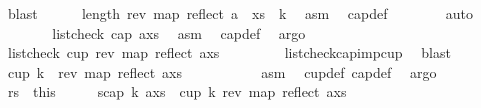 \begin{isabellebody}
\ blast\isanewline
\ \ \ \ \isamarkupfalse%
\ {}{\isacharcolon}{\kern0pt}{\isachardoublequoteopen}length\ {\isacharparenleft}{\kern0pt}rev\ {\isacharparenleft}{\kern0pt}map\ reflect\ {\isacharparenleft}{\kern0pt}a\ {\isacharhash}{\kern0pt}\ xs{\isacharparenright}{\kern0pt}{\isacharparenright}{\kern0pt}{\isacharparenright}{\kern0pt}\ {\isacharequal}{\kern0pt}\ k{\isachardoublequoteclose}\ \isamarkupfalse%
\ asm\ \isamarkupfalse%
\ cap{\isacharunderscore}{\kern0pt}def\isanewline
\ \ \ \ \ \ \isamarkupfalse%
\ auto\isanewline
\ \ \ \ \isamarkupfalse%
\ \isamarkupfalse%
\ {\isachardoublequoteopen}list{\isacharunderscore}{\kern0pt}check\ cap{}\ {\isacharparenleft}{\kern0pt}a{\isacharhash}{\kern0pt}xs{\isacharparenright}{\kern0pt}{\isachardoublequoteclose}\ \isamarkupfalse%
\ asm\ \isamarkupfalse%
\ cap{\isacharunderscore}{\kern0pt}def\ \isamarkupfalse%
\ argo\isanewline
\ \ \ \ \isamarkupfalse%
\ {\isachardoublequoteopen}list{\isacharunderscore}{\kern0pt}check\ cup{}\ {\isacharparenleft}{\kern0pt}rev\ {\isacharparenleft}{\kern0pt}map\ reflect\ {\isacharparenleft}{\kern0pt}a{\isacharhash}{\kern0pt}xs{\isacharparenright}{\kern0pt}{\isacharparenright}{\kern0pt}{\isacharparenright}{\kern0pt}{\isachardoublequoteclose}\ \isanewline
\ \ \ \ \ \ \isamarkupfalse%
\ list{\isacharunderscore}{\kern0pt}check{\isacharunderscore}{\kern0pt}cap{}{\isacharunderscore}{\kern0pt}imp{\isacharunderscore}{\kern0pt}cup{}\ \isamarkupfalse%
\ blast\isanewline
\ \ \ \ \isamarkupfalse%
\ {\isachardoublequoteopen}cup\ k\ \ {\isacharparenleft}{\kern0pt}rev\ {\isacharparenleft}{\kern0pt}map\ reflect\ {\isacharparenleft}{\kern0pt}a{\isacharhash}{\kern0pt}xs{\isacharparenright}{\kern0pt}{\isacharparenright}{\kern0pt}{\isacharparenright}{\kern0pt}{\isachardoublequoteclose}\ \isanewline
\ \ \ \ \ \ \isamarkupfalse%
\ {}\ {}\ asm\ \isamarkupfalse%
\ cup{\isacharunderscore}{\kern0pt}def\ cap{\isacharunderscore}{\kern0pt}def\ \isamarkupfalse%
\ argo\isakeywordONE{{\isacharbraceright}{\kern0pt}}\isamarkupfalse%
\ \isamarkupfalse%
\ rs\ {\isacharequal}{\kern0pt}\ this\isanewline
\ \ \isamarkupfalse%
\ \isamarkupfalse%
\ s{}{\isacharcolon}{\kern0pt}{\isachardoublequoteopen}cap\ k\ {\isacharparenleft}{\kern0pt}a{\isacharhash}{\kern0pt}xs{\isacharparenright}{\kern0pt}\ {\isasymlongrightarrow}\ cup\ k\ {\isacharparenleft}{\kern0pt}rev\ {\isacharparenleft}{\kern0pt}map\ reflect\ {\isacharparenleft}{\kern0pt}a{\isacharhash}{\kern0pt}xs{\isacharparenright}{\kern0pt}{\isacharparenright}{\kern0pt}{\isacharparenright}{\kern0pt}{\isachardoublequoteclose}\ \isamarkupfalse%

\end{isabellebody}
